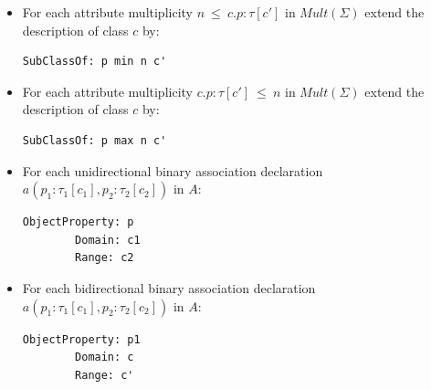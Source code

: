 \documentclass[10pt,fleqn,final]{scrreprt}
\newenvironment{definitions}[0]{\medskip }{}
\begin{document}
\begin{definitions}
\begin{itemize}
\item For each attribute multiplicity $n\ \mathsf{\leq}\ c.p:\tau[c']$ in $\mathit{Mult}(\Sigma)$ extend the description of class $c$ by:
\begin{lstlisting}[language=owl2Manchester]
	SubClassOf: p min n c'
\end{lstlisting}

\item For each attribute multiplicity $ c.p:\tau[c'] \ \mathsf{\leq}\ n$  in $\mathit{Mult}(\Sigma)$ extend the description of class $c$ by:
\begin{lstlisting}[language=owl2Manchester]
	SubClassOf: p max n c'
\end{lstlisting}

\item For each unidirectional binary association declaration $a(p_1:\tau_1[c_1],p_2:\tau_2[c_2])$ in $A$:
\begin{lstlisting}[language=owl2Manchester]
	ObjectProperty: p
		Domain: c1
		Range: c2
\end{lstlisting}
\item For each bidirectional binary association declaration $a(p_1:\tau_1[c_1],p_2:\tau_2[c_2])$ in $A$:
\begin{lstlisting}[language=owl2Manchester]
	ObjectProperty: p1
		Domain: c
		Range: c'


\end{lstlisting}
\end{itemize}
\end{definitions}
\end{document}
